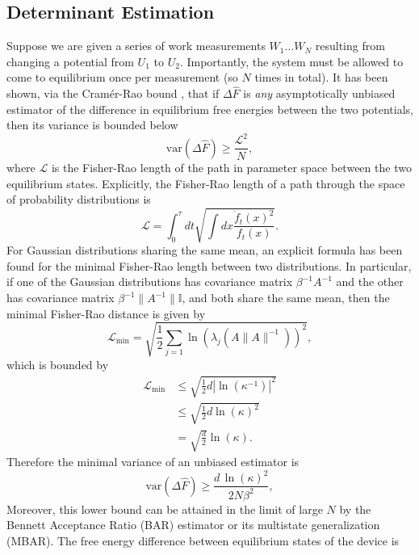 \documentclass[prx,onecolumn,floatfix,longbibliography,notitlepage, nofootinbib,12pt]{revtex4-2}
\renewcommand{\geq}{\geqslant}
\renewcommand{\leq}{\leqslant}
\begin{document}
\begin{appendix}
\section{Determinant Estimation}
Suppose we are given a series of work measurements $W_1 \dots W_N$ resulting from changing a potential from $U_1$ to $U_2$. Importantly, the system must be allowed to come to equilibrium once per measurement (so $N$ times in total). It has been shown, via the Cramér-Rao bound \cite{cramer1999mathematical}, that if $\Delta \hat{F}$ is \emph{any} asymptotically unbiased estimator of the difference in equilibrium free energies between the two potentials, then its variance is bounded below \cite{shenfeld2009minimizing}
\begin{equation}
    \text{var}\left(\Delta \hat{F} \right)\geq \frac{\mathcal{L}^2}{N},
\end{equation}
where $\mathcal{L}$ is the Fisher-Rao length of the path in parameter space between the two equilibrium states. Explicitly, the Fisher-Rao length of a path through the space of probability distributions is
\begin{equation}
    \mathcal{L} = \int_0^\tau dt \sqrt{\int dx \frac{\dot{f}_t(x)^2}{f_t(x)}}.
\end{equation}
For Gaussian distributions sharing the same mean, an explicit formula has been found for the minimal Fisher-Rao length between two distributions. In particular, if one of the Gaussian distributions has covariance matrix $\beta^{-1}A^{-1}$ and the other has covariance matrix $\beta^{-1} \|A^{-1}\|\mathbb{I}$, and both share the same mean, then the minimal Fisher-Rao distance is given by \cite{nielsen2023simple}
\begin{equation}
  \mathcal{L}_{\text{min}}  = \sqrt{\frac{1}{2} \sum_{j=1} \ln( \lambda_j(A\|A\|^{-1}))^2},
\end{equation}
which is bounded by
\begin{align}
  \mathcal{L}_{\text{min}} &\leq  \sqrt{\frac{1}{2} d \left|\ln( \kappa^{-1})\right|^2} \\
  &\leq  \sqrt{\frac{1}{2} d \ln( \kappa)^2} \\
  &=\sqrt{\frac{d}{2}}\ln(\kappa).
\end{align}
Therefore the minimal variance of an unbiased estimator is
\begin{equation}
    \text{var}\left(\Delta \hat{F} \right)\geq \frac{d\,\ln(\kappa)^2}{2N \beta^2},
\end{equation}
Moreover, this lower bound can be attained in the limit of large $N$ by the Bennett Acceptance Ratio (BAR) estimator or its multistate generalization (MBAR). The free energy difference between equilibrium states of the device is

\end{appendix}
\end{document}

